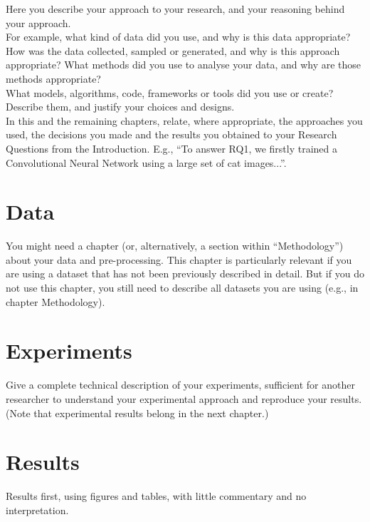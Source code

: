 \documentclass[a4paper,12pt]{Classes/RoboticsLaTeX}
\begin{document}
	Here you describe your approach to your research, and your reasoning behind your approach.\\
	
	For example, what kind of data did you use, and why is this data appropriate? How was the data collected, sampled or generated, and why is this approach appropriate? What methods did you use to analyse your data, and why are those methods appropriate?\\
	
	What models, algorithms, code, frameworks or tools did you use or create? Describe them, and justify your choices and designs. \\
	
	In this and the remaining chapters, relate, where appropriate, the approaches you used, the decisions you made and the results you obtained to your Research Questions from the Introduction. E.g., ``To answer RQ1, we firstly trained a Convolutional Neural Network using a large set of cat images...''.
	
	\chapter{Data}
	\label{chap:data}
	
	You might need a chapter (or, alternatively, a section within ``Methodology'') about your data and pre-processing. This chapter is particularly relevant if you are using a dataset that has not been previously described in detail. But if you do not use this chapter, you still need to describe all datasets you are using (e.g., in chapter Methodology).
	
	\chapter{Experiments}
	\label{chap:experiments}
	
	Give a complete technical description of your experiments, sufficient for another researcher to understand your experimental approach and reproduce your results. \\
	
	\noindent (Note that experimental results belong in the next chapter.) 
	
	\chapter{Results}
	\label{chap:results}
	
	Results first, using figures and tables, with little commentary and no interpretation.
	
\end{document}
